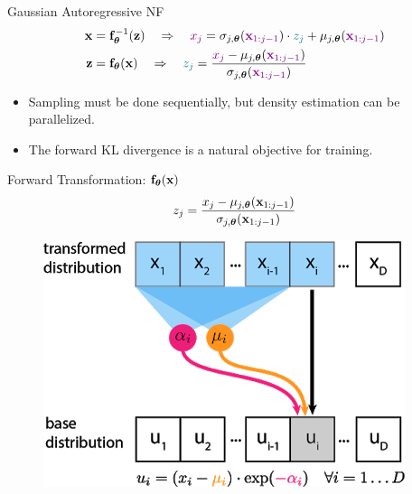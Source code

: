 \documentclass{beamer}
\begin{document}
\begin{frame}{Gaussian Autoregressive NF}
	\vspace{-0.5cm}
	\begin{align*}
		\mathbf{x} &= \mathbf{f}^{-1}_{\boldsymbol{\theta}}(\mathbf{z}) \quad \Rightarrow \quad {\color{violet} x_j} = \sigma_{j, \boldsymbol{\theta}} ({\color{violet} \mathbf{x}_{1:j-1}}) \cdot {\color{teal} z_j} + \mu_{j, \boldsymbol{\theta}}({\color{violet} \mathbf{x}_{1:j-1}}) \\
		\mathbf{z} &= \mathbf{f}_{\boldsymbol{\theta}}(\mathbf{x}) \quad \Rightarrow \quad {\color{teal} z_j} = \frac{{\color{violet}x_j} - \mu_{j, \boldsymbol{\theta}}({\color{violet}\mathbf{x}_{1:j-1}})}{\sigma_{j, \boldsymbol{\theta}} ({\color{violet}\mathbf{x}_{1:j-1}})}
	\end{align*}
	\vspace{-0.5cm}
	\eqpause
	\begin{itemize}
		\item Sampling must be done sequentially, but density estimation can be parallelized.
		\item The forward KL divergence is a natural objective for training.
	\end{itemize}
	\vspace{-0.3cm}
	\eqpause
	\begin{minipage}[t]{0.65\columnwidth}
		\begin{block}{Forward Transformation: $\mathbf{f}_{\boldsymbol{\theta}}(\mathbf{x})$}
			\[
				z_j = \frac{x_j - \mu_{j, \boldsymbol{\theta}}(\mathbf{x}_{1:j-1})}{\sigma_{j, \boldsymbol{\theta}} (\mathbf{x}_{1:j-1}) }
			\]
			\vspace{-0.4cm}
		\end{block}
	\end{minipage}%
	\begin{minipage}[t]{0.35\columnwidth}
		\begin{figure}[h]
			\centering
			\includegraphics[width=.9\linewidth]{figs/af_iaf_explained_2.png}

\end{figure}
\end{minipage}
\end{frame}
\end{document}
